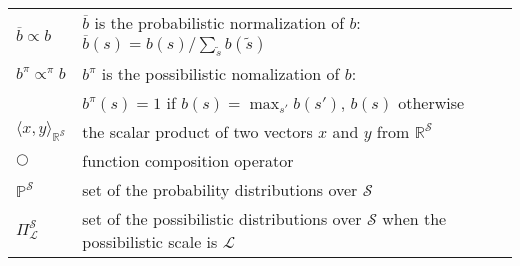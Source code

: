 \begin{supertabular}{ll}
  $\overline{b} \propto b $ & $\overline{b}$ is the probabilistic normalization of $b$: $\overline{b}(s) = b(s)/\sum_{\tilde{s}} b(\tilde{s})$\\
  $b^{\pi} \propto^{\pi} b$ & $b^{\pi}$ is the possibilistic nomalization of $b$:\\
	&  $b^{\pi}(s) = 1$ if $b(s) = \max_{s'}b(s')$, $b(s)$ otherwise\\
  $\langle x, y \rangle_{\mathbb{R}^{\mathcal{S}}}$ & the scalar product of two vectors $x$ and $y$ from $\mathbb{R}^{\mathcal{S}}$\\
  $\Circle$ & function composition operator\\
  $\mathbb{P}^{\mathcal{S}}$ & set of the probability distributions over $\mathcal{S}$\\
  $\Pi^{\mathcal{S}}_{\mathcal{L}}$ & set of the possibilistic distributions over $\mathcal{S}$ when the possibilistic scale is $\mathcal{L}$\\
\end{supertabular}

\chapterend
